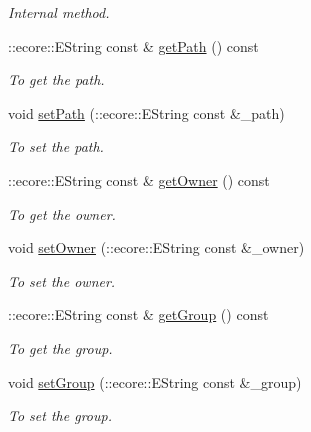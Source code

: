 \begin{DoxyCompactItemize}
\begin{DoxyCompactList}\small\item\em Internal method. \item\end{DoxyCompactList}\item 
::ecore::EString const \& \hyperlink{classFMS__Data_1_1FileStat_a8891dab46811de5966c86809d9a4bdee}{getPath} () const 
\begin{DoxyCompactList}\small\item\em To get the path. \item\end{DoxyCompactList}\item 
void \hyperlink{classFMS__Data_1_1FileStat_a75c7a2cdeeaf08ae86f06c98140d1208}{setPath} (::ecore::EString const \&\_\-path)
\begin{DoxyCompactList}\small\item\em To set the path. \item\end{DoxyCompactList}\item 
::ecore::EString const \& \hyperlink{classFMS__Data_1_1FileStat_ad6f29ab832c353fc710b9fbbddb3b012}{getOwner} () const 
\begin{DoxyCompactList}\small\item\em To get the owner. \item\end{DoxyCompactList}\item 
void \hyperlink{classFMS__Data_1_1FileStat_ac6a11f7206834bcd5ae21b2d9f6cd357}{setOwner} (::ecore::EString const \&\_\-owner)
\begin{DoxyCompactList}\small\item\em To set the owner. \item\end{DoxyCompactList}\item 
::ecore::EString const \& \hyperlink{classFMS__Data_1_1FileStat_a12fae4ad3d316e3793f4b6e1d59ae695}{getGroup} () const 
\begin{DoxyCompactList}\small\item\em To get the group. \item\end{DoxyCompactList}\item 
void \hyperlink{classFMS__Data_1_1FileStat_a21d4eaacc7ee418da942a3f9d57635f9}{setGroup} (::ecore::EString const \&\_\-group)
\begin{DoxyCompactList}\small\item\em To set the group. \item\end{DoxyCompactList}\item 

\end{DoxyCompactItemize}
